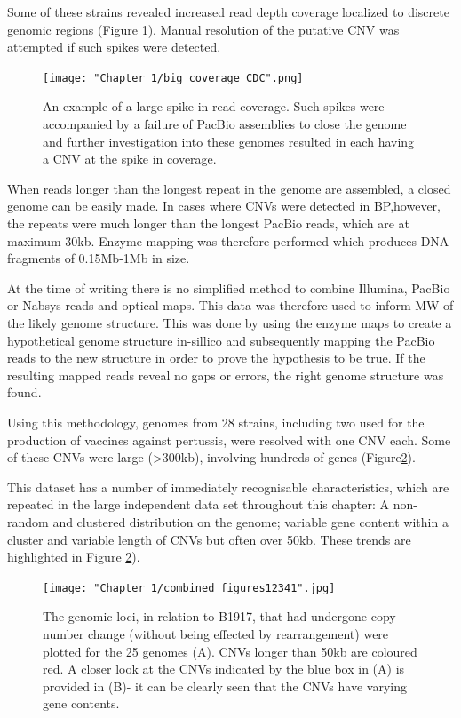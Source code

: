 \documentclass{article}
\begin{document}
Some of these strains revealed increased read depth coverage localized to discrete genomic regions (Figure \ref{fig:CDC_isolates_coverage}). Manual resolution of the putative CNV was attempted if such spikes were detected.

\begin{figure}[h!]
\centering
\texttt{[image: "Chapter\_1/big coverage CDC".png]}
\caption{An example of a large spike in read coverage. Such spikes were accompanied by a failure of PacBio assemblies to close the genome and further investigation into these genomes resulted in each having a CNV at the spike in coverage.}
\label{fig:CDC_isolates_coverage}
\end{figure}

When reads longer than the longest repeat in the genome are assembled, a closed genome can be easily made. In cases where CNVs were detected in BP,however, the repeats were much longer than the longest PacBio reads, which are at maximum 30kb. Enzyme mapping was therefore performed which produces DNA fragments of 0.15Mb-1Mb in size.

At the time of writing there is no simplified method to combine Illumina, PacBio or Nabsys reads and optical maps. This data was therefore used to inform MW of the likely genome structure. This was done by using the enzyme maps to create a hypothetical genome structure in-sillico and subsequently mapping the PacBio reads to the new structure in order to prove the hypothesis to be true. If the resulting mapped reads reveal no gaps or errors, the right genome structure was found.

Using this methodology, genomes from 28 strains, including two used for the production of vaccines against pertussis, were resolved with one CNV each. Some of these CNVs were large (>300kb), involving hundreds of genes (Figure\ref{fig:CDC_isolates}).

This dataset has a number of immediately recognisable characteristics, which are repeated in the large independent data set throughout this chapter: A non-random and clustered distribution on the genome; variable gene content within a cluster and variable length of CNVs but often over 50kb. These trends are highlighted in Figure \ref{fig:CDC_isolates}).

\begin{figure}[hbtp]
\centering
\texttt{[image: "Chapter\_1/combined figures12341".jpg]}
\caption{The genomic loci, in relation to B1917, that had undergone copy number change (without being effected by rearrangement) were plotted for the 25 genomes (A). CNVs longer than 50kb are coloured red. A closer look at the CNVs indicated by the blue box in (A) is provided in (B)- it can be clearly seen that the CNVs have varying gene contents.}
\label{fig:CDC_isolates}
\end{figure}
\end{document}

